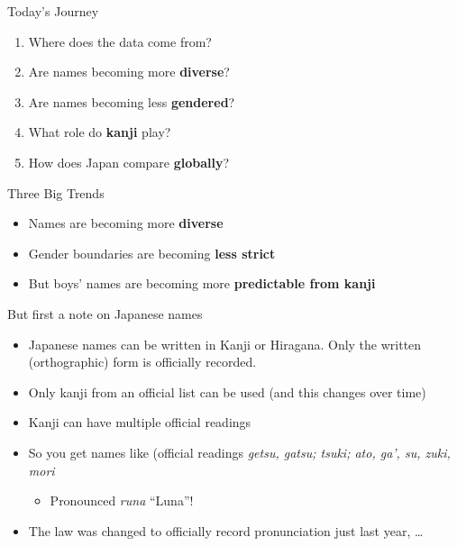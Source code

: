 \documentclass{beamer}
\begin{document}
\begin{frame}{Today's Journey}
  \begin{enumerate}
    \item Where does the data come from?
    \item Are names becoming more \textbf{diverse}?
    \item Are names becoming less \textbf{gendered}?
    \item What role do \textbf{kanji} play?
    \item How does Japan compare \textbf{globally}?
  \end{enumerate}
\end{frame}

\begin{frame}{Three Big Trends}
  \begin{itemize}
    \item Names are becoming more \textbf{diverse}
    \item Gender boundaries are becoming \textbf{less strict}
    \item But boys' names are becoming more \textbf{predictable from kanji}
  \end{itemize}
\end{frame}


\begin{frame}{But first a note on Japanese names}
  \begin{itemize}
  \item Japanese names can be written in Kanji or Hiragana.  Only the
    written (orthographic) form is officially recorded.
  \item Only kanji from an official list can be used (and this changes over time)
  \item Kanji can have multiple official readings 
  \item So you get names like  (official readings \textit{getsu,
      gatsu; tsuki; ato, ga', su, zuki, mori}
    \pause 
    \begin{itemize}
    \item Pronounced \textit{runa} ``Luna''!
    \end{itemize}
    \pause
  \item The law was changed to officially record pronunciation just last year, \ldots
  \end{itemize}
\end{frame}


\end{document}

